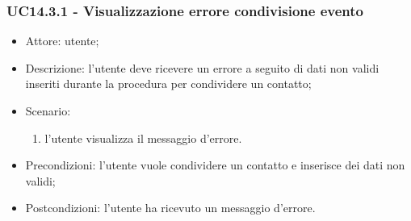 \subsubsection{UC14.3.1 - Visualizzazione errore condivisione evento} \label{sec: UC14.3.1}
\begin{itemize}
    \item Attore: utente;
    \item Descrizione: l'utente deve ricevere un errore a seguito di dati non validi inseriti durante la procedura per condividere un contatto;
    \item Scenario:
        \begin{enumerate}
        \item l'utente visualizza il messaggio d'errore.
        \end{enumerate}
    
    \item Precondizioni: l'utente vuole condividere un contatto e inserisce dei dati non validi;
    \item Postcondizioni: l'utente ha ricevuto un messaggio d'errore.
\end{itemize}